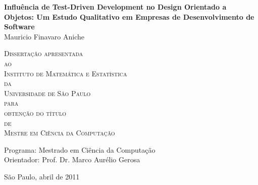 \documentclass[11pt,twoside,a4paper]{book}
\begin{document}
\frontmatter 
\fancyhead[RO]{{\footnotesize\rightmark}\hspace{2em}\thepage}
\setcounter{tocdepth}{2}
\fancyhead[LE]{\thepage\hspace{2em}\footnotesize{\leftmark}}
\fancyhead[RE,LO]{}
\fancyhead[RO]{{\footnotesize\rightmark}\hspace{2em}\thepage}

\onehalfspacing  %

\thispagestyle{empty}
\begin{center}
    \vspace*{2.3cm}
    \textbf{\Large{Influência de Test-Driven Development no Design Orientado a Objetos: Um Estudo Qualitativo em Empresas de Desenvolvimento de Software}}\\
    
    \vspace*{1.2cm}
    \Large{Mauricio Finavaro Aniche}
    
    \vskip 2cm
    \textsc{
    Dissertação apresentada\\[-0.25cm] 
    ao\\[-0.25cm]
    Instituto de Matemática e Estatística\\[-0.25cm]
    da\\[-0.25cm]
    Universidade de São Paulo\\[-0.25cm]
    para\\[-0.25cm]
    obtenção do título\\[-0.25cm]
    de\\[-0.25cm]
    Mestre em Ciência da Computação}
    
    \vskip 1.5cm
    Programa: Mestrado em Ciência da Computação\\
    Orientador: Prof. Dr. Marco Aurélio Gerosa

   	\vskip 1.5cm
    \normalsize{São Paulo, abril de 2011}
\end{center}

\end{document}
